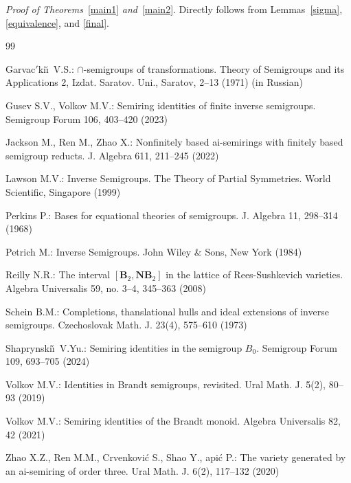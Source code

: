 \documentclass[12pt,draft]{amsart}
\begin{document}
\emph{Proof of Theorems}~\ref{main1} \emph{and}~\ref{main2}. Directly follows from Lemmas~\ref{sigma}, \ref{equivalence}, and \ref{final}.

\begin{thebibliography}{99}

 Garvac$'$ki\u\i\ V.S.: $\cap$-semigroups of transformations. Theory of Semigroups and its Applications 2, Izdat. Saratov. Uni., Saratov, 2--13 (1971) (in Russian)

 Gusev S.V., Volkov M.V.: Semiring identities of finite inverse semigroups. Semigroup Forum 106, 403--420 (2023)

 Jackson M., Ren M., Zhao X.: Nonfinitely based ai-semirings with finitely based semigroup reducts. J. Algebra 611, 211--245 (2022)

 Lawson M.V.: Inverse Semigroups. The Theory of Partial Symmetries. World Scientific, Singapore (1999)

 Perkins P.: Bases for equational theories of semigroups. J. Algebra 11, 298--314 (1968)

 Petrich M.: Inverse Semigroups. John Wiley \& Sons, New York (1984)

 Reilly N.R.: The interval $[\mathbf B_2,\mathbf{NB}_2]$ in the lattice of Rees-Sushkevich varieties. Algebra Universalis 59, no. 3--4, 345--363 (2008)

 Schein B.M.: Completions, thanslational hulls and ideal extensions of inverse semigroups. Czechoslovak Math. J. 23(4), 575--610 (1973)

 Shaprynski\v\i\ V.Yu.: Semiring identities in the semigroup $B_0$. Semigroup Forum 109, 693--705 (2024) 

 Volkov M.V.: Identities in Brandt semigroups, revisited. Ural Math. J. 5(2), 80--93 (2019)

 Volkov M.V.: Semiring identities of the Brandt monoid. Algebra Universalis 82, 42 (2021)

 Zhao X.Z., Ren M.M., Crvenkovi\'c S., Shao Y., \DJ api\'c P.: The variety generated by an ai-semiring of order three. Ural Math. J. 6(2), 117--132 (2020)
\end{thebibliography}
\end{document}

